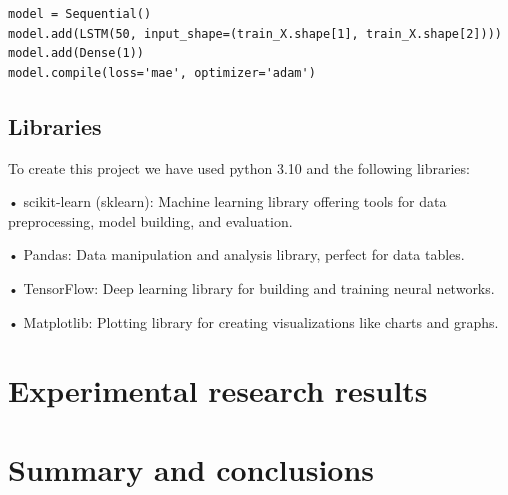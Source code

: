 \documentclass{article}
\begin{document}
\begin{flushleft}
\begin{justify}

\begin{lstlisting}[caption={Example Python code}, label=lst:example]
model = Sequential()
model.add(LSTM(50, input_shape=(train_X.shape[1], train_X.shape[2])))
model.add(Dense(1))
model.compile(loss='mae', optimizer='adam')
\end{lstlisting}






\subsection{Libraries}
To create this project we have used python 3.10 and the following libraries:

•	scikit-learn (sklearn): Machine learning library offering tools for data preprocessing, model building, and evaluation.

•	Pandas: Data manipulation and analysis library, perfect for data tables.

•	TensorFlow: Deep learning library for building and training neural networks.

•	Matplotlib: Plotting library for creating visualizations like charts and graphs.



\section{Experimental research results}



\section{Summary and conclusions}

\end{justify}
\end{flushleft}
\end{document}
